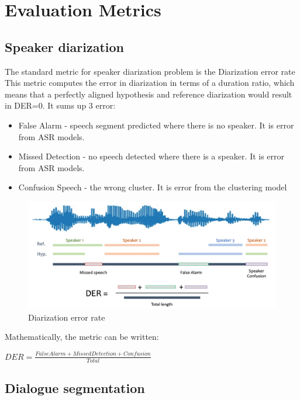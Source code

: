\documentclass[PMI,VKR]{HSEUniversity}
\begin{document}
\section{Evaluation Metrics}

\subsection{Speaker diarization}

The standard metric for speaker diarization problem is the Diarization error rate \:
This metric computes the error in diarization in terms of a duration ratio, which means that a perfectly aligned hypothesis and reference diarization would result in DER=0. It sums up 3 error:
\begin{itemize}
    \item False Alarm - speech segment predicted where there is no speaker. It is error from ASR models.
    \item Missed Detection - no speech detected where there is a speaker. It is error from ASR models.
    \item Confusion	Speech - the wrong cluster. It is error from the clustering model
\end{itemize}

\begin{figure}[h]
    \centering
    \includegraphics[scale=0.8]{img/der.png}
    \caption{Diarization error rate }
\end{figure}

Mathematically, the metric can be written: 
\begin{center}
    $DER = \frac{False Alarm  +  Missed Detection  +  Confusion}{Total}$    
\end{center}

\subsection{Dialogue segmentation}
\end{document}

